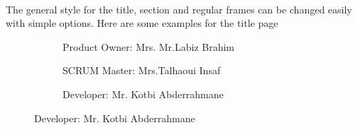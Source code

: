 \begin{frame}[fragile=singleslide]{\insertsectionhead}
  \framesubtitle{\insertsubsectionhead}
  The general style for the title, section and regular frames can be changed
  easily with simple options. Here are some examples for the title page
  \begin{figure}[ht!]
    \begin{subfigure}[b]{0.3\textwidth}
      \caption*{Product Owner: Mrs. Mr.Labiz Brahim}
    \end{subfigure}
    \hspace{\fill}
    \begin{subfigure}[b]{0.3\textwidth}
      \caption*{SCRUM Master: Mrs.Talhaoui Insaf}
    \end{subfigure}
    \hspace{\fill}
    \begin{subfigure}[b]{0.3\textwidth}
      \caption*{Developer: Mr. Kotbi Abderrahmane}
    \end{subfigure}
  \end{figure}
\end{frame}

